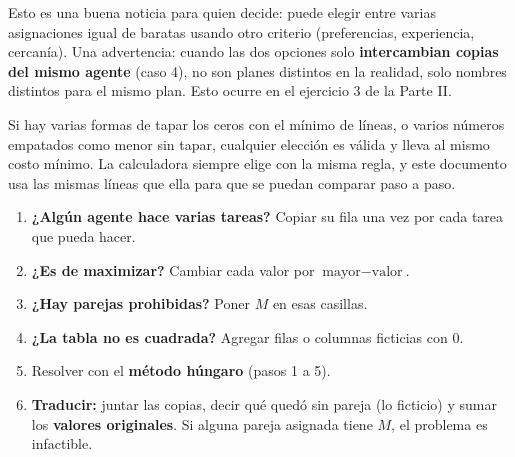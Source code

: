 \documentclass[11pt,a4paper]{article}
\let\pasobase\paso
\renewcommand{\paso}[1]{\needspace{7\baselineskip}\pasobase{#1}}
\begin{document}
\medskip
Esto es una buena noticia para quien decide: puede elegir entre varias asignaciones igual de baratas usando otro
criterio (preferencias, experiencia, cercanía). Una advertencia: cuando las dos opciones solo \textbf{intercambian
copias del mismo agente} (caso 4), no son planes distintos en la realidad, solo nombres distintos para el mismo plan.
Esto ocurre en el ejercicio 3 de la Parte II.

Si hay varias formas de tapar los ceros con el mínimo de líneas, o varios números empatados como menor sin tapar,
cualquier elección es válida y lleva al mismo costo mínimo. La calculadora siempre elige con la misma regla, y
este documento usa las mismas líneas que ella para que se puedan comparar paso a paso.

\begin{idea}
\begin{enumerate}[leftmargin=*, itemsep=3pt]
  \item \textbf{¿Algún agente hace varias tareas?} Copiar su fila una vez por cada tarea que pueda hacer.
  \item \textbf{¿Es de maximizar?} Cambiar cada valor por $\text{mayor} - \text{valor}$.
  \item \textbf{¿Hay parejas prohibidas?} Poner $M$ en esas casillas.
  \item \textbf{¿La tabla no es cuadrada?} Agregar filas o columnas ficticias con 0.
  \item Resolver con el \textbf{método húngaro} (pasos 1 a 5).
  \item \textbf{Traducir:} juntar las copias, decir qué quedó sin pareja (lo ficticio) y sumar los
        \textbf{valores originales}. Si alguna pareja asignada tiene $M$, el problema es infactible.
\end{enumerate}
\end{idea}
\end{document}

